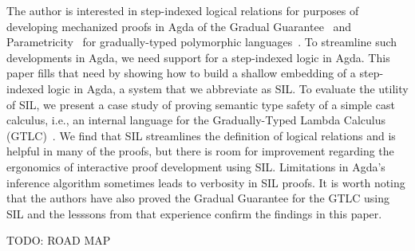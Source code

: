 \documentclass[acmsmall]{acmart}
\begin{document}
The author is interested in step-indexed logical relations for
purposes of developing mechanized proofs in Agda of the Gradual
Guarantee~\citep{Siek:2015ac} and Parametricity~\citep{REYNOLDS74C}
for gradually-typed polymorphic
languages~\citep{Ahmed:2011fk,Ahmed:2017aa,Igarashi:2017aa,New:2019ab,Labrada:2020tk}.
To streamline such developments in Agda, we need support for a
step-indexed logic in Agda. This paper fills that need by showing how
to build a shallow embedding of a step-indexed logic in Agda, a system
that we abbreviate as SIL. To evaluate the utility of SIL, we present
a case study of proving semantic type safety of a simple cast
calculus, i.e., an internal language for the Gradually-Typed Lambda
Calculus (GTLC)~\citep{Siek:2006bh,Siek:2007qy}. We find that SIL
streamlines the definition of logical relations and is helpful in many
of the proofs, but there is room for improvement regarding the
ergonomics of interactive proof development using SIL.  Limitations in
Agda's inference algorithm sometimes leads to verbosity in SIL
proofs. It is worth noting that the authors have also proved the
Gradual Guarantee for the GTLC using SIL and the lesssons from that
experience confirm the findings in this paper.

TODO: ROAD MAP



\end{document}
